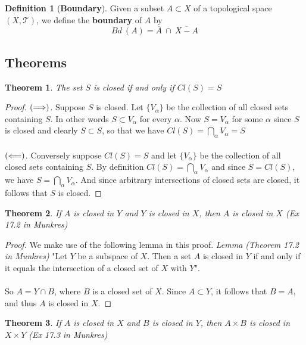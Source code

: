 \documentclass{article}
\newtheorem{theorem}{Theorem}[section]
\theoremstyle{remark}
\theoremstyle{definition}
\newtheorem{definition}{Definition}[section]
\newcommand{\simplies}{\DOTSB\Longrightarrow}
\newcommand{\lsimplies}{\DOTSB\Longleftarrow}
\begin{document}
\bigskip

\begin{definition}[\textbf{Boundary}]
Given a subset $A \subset X$ of a topological space $(X , \mathcal{T})$, we define the \textbf{boundary} of $A$ by $$Bd \ (A) = \overline{A} \ \cap \ \overline{X-A}$$
\end{definition}

\newpage

\subsection{Theorems}

\begin{theorem}
The set $S$ is closed if and only if $Cl(S) = S$
\end{theorem}

\begin{proof}[Proof]
$(\simplies)$. Suppose $S$ is closed. Let $\{V_{\alpha}\}$ be the collection of all closed sets containing $S$. In other words $S \subset V_{\alpha}$ for every $\alpha$. Now $S = V_{\alpha}$ for some $\alpha$ since $S$ is closed and clearly $S \subset S$, so that we have $Cl(S) = \bigcap_{\alpha}V_{\alpha} = S$
\\ \\ 
$(\lsimplies)$. Conversely suppose $Cl(S) = S$ and let $\{V_{\alpha}\}$ be the collection of all closed sets containing $S$. By definition $Cl(S) = \bigcap_{\alpha}V_{\alpha}$ and since $S = Cl(S)$, we have $S = \bigcap_{\alpha}V_{\alpha}$. And since arbitrary intersections of closed sets are closed, it follows that $S$ is closed.
\end{proof}
\medskip
\begin{theorem}
If $A$ is closed in $Y$ and $Y$ is closed in $X$, then $A$ is closed in $X$ (Ex 17.2 in Munkres)
\end{theorem}

\begin{proof}
We make use of the following lemma in this proof. 
\textit{Lemma (Theorem 17.2 in Munkres)} "Let $Y$ be a subspace of $X$. Then a set $A$ is closed in $Y$ if and only if it equals the intersection of a closed set of $X$ with $Y$".
\\ \\
So $A = Y \cap B$, where $B$ is a closed set of $X$. Since $A \subset Y$, it follows that $B = A$, and thus $A$ is closed in $X$.
\end{proof}
\medskip
\begin{theorem}
If $A$ is closed in $X$ and $B$ is closed in $Y$, then $A \times B$ is closed in $X \times Y$ (Ex 17.3 in Munkres)
\end{theorem}
\end{document}
